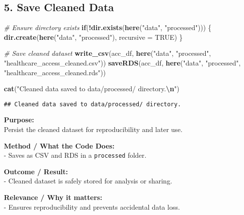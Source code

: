 \documentclass[
]{article}
\newenvironment{Shaded}{\begin{snugshade}}{\end{snugshade}}
\newcommand{\AttributeTok}[1]{\textcolor[rgb]{0.13,0.29,0.53}{#1}}
\newcommand{\CommentTok}[1]{\textcolor[rgb]{0.56,0.35,0.01}{\textit{#1}}}
\newcommand{\ConstantTok}[1]{\textcolor[rgb]{0.56,0.35,0.01}{#1}}
\newcommand{\ControlFlowTok}[1]{\textcolor[rgb]{0.13,0.29,0.53}{\textbf{#1}}}
\newcommand{\FunctionTok}[1]{\textcolor[rgb]{0.13,0.29,0.53}{\textbf{#1}}}
\newcommand{\NormalTok}[1]{#1}
\newcommand{\SpecialCharTok}[1]{\textcolor[rgb]{0.81,0.36,0.00}{\textbf{#1}}}
\newcommand{\StringTok}[1]{\textcolor[rgb]{0.31,0.60,0.02}{#1}}
\begin{document}
\subsection{5. Save Cleaned Data}\label{save-cleaned-data}

\begin{Shaded}
\begin{Highlighting}[]
\CommentTok{\# Ensure directory exists}
\ControlFlowTok{if}\NormalTok{(}\SpecialCharTok{!}\FunctionTok{dir.exists}\NormalTok{(}\FunctionTok{here}\NormalTok{(}\StringTok{"data"}\NormalTok{, }\StringTok{"processed"}\NormalTok{))) \{}
  \FunctionTok{dir.create}\NormalTok{(}\FunctionTok{here}\NormalTok{(}\StringTok{"data"}\NormalTok{, }\StringTok{"processed"}\NormalTok{), }\AttributeTok{recursive =} \ConstantTok{TRUE}\NormalTok{)}
\NormalTok{\}}

\CommentTok{\# Save cleaned dataset}
\FunctionTok{write\_csv}\NormalTok{(acc\_df, }\FunctionTok{here}\NormalTok{(}\StringTok{"data"}\NormalTok{, }\StringTok{"processed"}\NormalTok{, }\StringTok{"healthcare\_access\_cleaned.csv"}\NormalTok{))}
\FunctionTok{saveRDS}\NormalTok{(acc\_df, }\FunctionTok{here}\NormalTok{(}\StringTok{"data"}\NormalTok{, }\StringTok{"processed"}\NormalTok{, }\StringTok{"healthcare\_access\_cleaned.rds"}\NormalTok{))}

\FunctionTok{cat}\NormalTok{(}\StringTok{"Cleaned data saved to data/processed/ directory.}\SpecialCharTok{\textbackslash{}n}\StringTok{"}\NormalTok{)}
\end{Highlighting}
\end{Shaded}

\begin{verbatim}
## Cleaned data saved to data/processed/ directory.
\end{verbatim}

\textbf{Purpose:}\\
Persist the cleaned dataset for reproducibility and later use.

\textbf{Method / What the Code Does:}\\
- Saves as CSV and RDS in a \texttt{processed} folder.

\textbf{Outcome / Result:}\\
- Cleaned dataset is safely stored for analysis or sharing.

\textbf{Relevance / Why it matters:}\\
- Ensures reproducibility and prevents accidental data loss.
\end{document}
